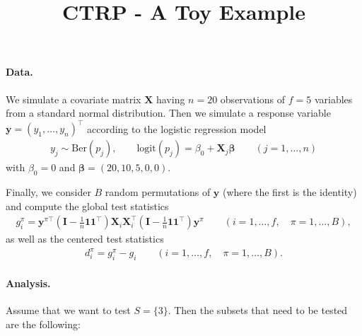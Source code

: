 \documentclass[11pt,a4paper,openright,twoside]{article}
\title{CTRP - A Toy Example}
\author{}
\date{}
\begin{document}
\maketitle


\paragraph{Data.} We simulate a covariate matrix $\mathbf{X}$ having $n=20$ observations of $f=5$ variables from a standard normal distribution. Then we simulate a response variable $\mathbf{y}=(y_1,\ldots,y_n)^\top$ according to the logistic regression model
\begin{align*}
y_j\sim\text{Ber}(p_j),\quad\quad\text{logit}(p_j)=\beta_0+\mathbf{X}_j\boldsymbol{\beta}\quad\quad(j=1,\ldots,n)
\end{align*}
with $\beta_0=0$ and $\mathbf{\beta}=(20,10,5,0,0)$.

Finally, we consider $B$ random permutations of $\mathbf{y}$ (where the first is the identity) and compute the global test statistics
\begin{align*}
g_i^\pi =\mathbf{y}^{\pi\top}\left(\mathbf{I}-\frac{1}{n}\mathbf{1}\mathbf{1}^\top\right)\mathbf{X}_i\mathbf{X}_i^\top\left(\mathbf{I}-\frac{1}{n}\mathbf{1}\mathbf{1}^\top\right)\mathbf{y}^{\pi} \quad\quad(i=1,\ldots,f,\quad \pi=1,\ldots,B),
\end{align*}
as well as the centered test statistics
\begin{align*}
d_i^\pi=g_i^\pi - g_i\quad\quad(i=1,\ldots,f,\quad \pi=1,\ldots,B).
\end{align*}


\vspace{5mm}
\paragraph{Analysis.} Assume that we want to test $S=\{3\}$. Then the subsets that need to be tested are the following:

\begin{table}[h!]
\centering
{}
\end{table}
\end{document}
